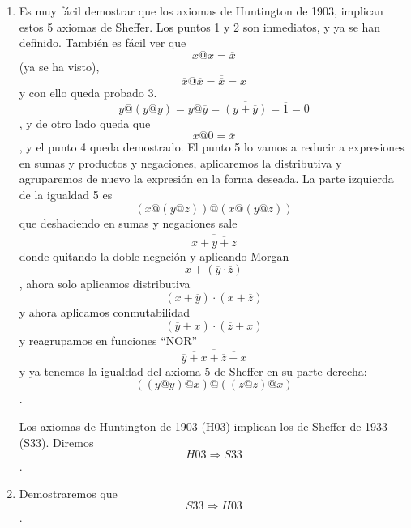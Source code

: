 \documentclass[
]{article}
\providecommand{\tightlist}{%
  \setlength{\itemsep}{0pt}\setlength{\parskip}{0pt}}
\begin{document}
\begin{enumerate}
\begin{enumerate}
\begin{enumerate}
\begin{enumerate}
        \begin{enumerate}
        \def\labelenumv{\arabic{enumv}.}
        \tightlist
        \item
          \[{\#\left( B \right)} \geq 2\]
        \item
          \[{{\cdot @} \cdot}:{{B \times B}\rightarrow B}\forall x,{y \in B}\exists!{z \in B}x@{y = z}\]
        \item
          \[\forall{x \in B}{({x@x})}@{{({x@x})} = x}\]
        \item
          \[\forall x,{y \in B}x@{{({y@{({y@y})}})} = x}@x\]
        \item
          \[\forall x,y,{z \in B}{({x@{({y@z})}})}@{{({x@{({y@z})}})} = {({{({y@y})}@x})}}@{({{({z@z})}@x})}\]
        \end{enumerate}
      \item
        Es muy fácil demostrar que los axiomas de Huntington de 1903,
        implican estos 5 axiomas de Sheffer. Los puntos 1 y 2 son
        inmediatos, y ya se han definido. También es fácil ver que
        \[x@{x = \overline{x}}\] (ya se ha visto),
        \[\overline{x}@{{\overline{x} = \overline{\overline{x}}} = x}\]y
        con ello queda probado
        3.\[y@{{({y@y})} = y}@{{{\overline{y} = \overline{({y+\overline{y}})}} = \overline{1}} = 0}\],
        y de otro lado queda que \[x@{0 = \overline{x}}\], y el punto 4
        queda demostrado. El punto 5 lo vamos a reducir a expresiones en
        sumas y productos y negaciones, aplicaremos la distributiva y
        agruparemos de nuevo la expresión en la forma deseada. La parte
        izquierda de la igualdad 5 es
        \[{({x@{({y@z})}})}@{({x@{({y@z})}})}\]que deshaciendo en sumas
        y negaciones sale\[\overline{\overline{x+\overline{y+z}}}\]donde
        quitando la doble negación y aplicando
        Morgan\[x + {({\overline{y} \cdot \overline{z}})}\], ahora solo
        aplicamos
        distributiva\[{({x + \overline{y}})} \cdot {({x + \overline{z}})}\]
        y ahora aplicamos
        conmutabilidad\[{({\overline{y} + x})} \cdot {({\overline{z} + x})}\]y
        reagrupamos en funciones
        ``NOR''\[\overline{\overline{\overline{y}+x}+\overline{\overline{z}+x}}\]y
        ya tenemos la igualdad del axioma 5 de Sheffer en su parte
        derecha:\[{({{({y@y})}@x})}@{({{({z@z})}@x})}\].

        Los axiomas de Huntington de 1903 (H03) implican los de Sheffer
        de 1933 (S33). Diremos \[\mathit{H03}\Rightarrow\mathit{S33}\].
      \item
        Demostraremos que \[\mathit{S33}\Rightarrow\mathit{H03}\].


\end{enumerate}
\end{enumerate}
\end{enumerate}
\end{enumerate}
\end{document}
